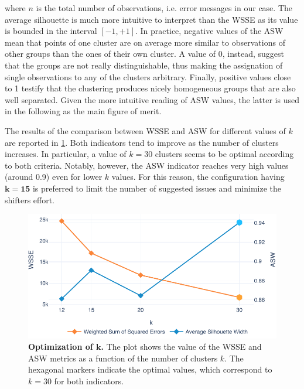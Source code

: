 where $n$ is the total number of observations, i.e. error messages in our case.
The average silhouette is much more intuitive to interpret than the WSSE as its value is bounded in the interval $\left[ -1, +1 \right]$.
In practice, negative values of the ASW mean that points of one cluster are on average more similar to observations of other groups than the ones of their own cluster. A value of 0, instead, suggest that the groups are not really distinguishable, thus making the assignation of single observations to any of the clusters arbitrary.
Finally, positive values close to 1 testify that the clustering produces nicely homogeneous groups that are also well separated.
Given the more intuitive reading of ASW values, the latter is used in the following as the main figure of merit.


The results of the comparison between WSSE and ASW for different values of $k$ are reported in \cref{fig:k_optim}.
Both indicators tend to improve as the number of clusters increases.
In particular, a value of $k=30$ clusters seems to be optimal according to both criteria.
Notably, however, the ASW indicator reaches very high values (around 0.9) even for lower $k$ values.
For this reason, the configuration having $\boldsymbol{k=15}$ is preferred to limit the number of suggested issues and minimize the shifters effort.

\begin{figure}
    \centering
    \includegraphics[width=\textwidth]{figures/410_method/kmeans/k_optim.pdf}
    \caption{\textbf{Optimization of $\boldsymbol{k}$.} The plot shows the value of the WSSE and ASW metrics as a function of the number of clusters $k$. The hexagonal markers indicate the optimal values, which correspond to $k=30$ for both indicators.}
    \label{fig:k_optim}
\end{figure}
